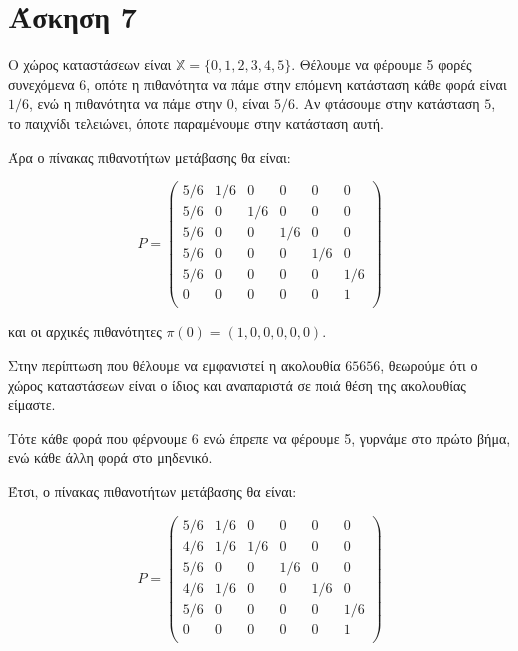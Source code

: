 \documentclass[11pt,a4paper]{article}
\begin{document}
\section*{Άσκηση 7}

Ο χώρος καταστάσεων είναι $\mathbb{X} = \{0, 1, 2, 3, 4, 5\}$. Θέλουμε να φέρουμε 5 φορές συνεχόμενα 6, οπότε η πιθανότητα να πάμε στην επόμενη κατάσταση κάθε φορά είναι $1/6$, ενώ η πιθανότητα να πάμε στην $0$, είναι $5/6$. Αν φτάσουμε στην κατάσταση $5$, το παιχνίδι τελειώνει, όποτε παραμένουμε στην κατάσταση αυτή.

Άρα ο πίνακας πιθανοτήτων μετάβασης θα είναι:

\begin{equation*}
    P = 
    \begin{pmatrix}
        5/6 & 1/6 & 0   & 0   & 0   & 0   \\
        5/6 & 0   & 1/6 & 0   & 0   & 0   \\
        5/6 & 0   & 0   & 1/6 & 0   & 0   \\
        5/6 & 0   & 0   & 0   & 1/6 & 0   \\
        5/6 & 0   & 0   & 0   & 0   & 1/6 \\
        0   & 0   & 0   & 0   & 0   & 1   \\
    \end{pmatrix}
\end{equation*}

και οι αρχικές πιθανότητες $π(0) = (1, 0, 0, 0, 0, 0)$.


Στην περίπτωση που θέλουμε να εμφανιστεί η ακολουθία $65656$, θεωρούμε ότι ο χώρος καταστάσεων είναι ο ίδιος και αναπαριστά σε ποιά θέση της ακολουθίας είμαστε.

Τότε κάθε φορά που φέρνουμε 6 ενώ έπρεπε να φέρουμε 5, γυρνάμε στο πρώτο βήμα, ενώ κάθε άλλη φορά στο μηδενικό.

Έτσι, ο πίνακας πιθανοτήτων μετάβασης θα είναι:

\begin{equation*}
    P = 
    \begin{pmatrix}
        5/6 & 1/6 & 0   & 0   & 0   & 0   \\
        4/6 & 1/6 & 1/6 & 0   & 0   & 0   \\
        5/6 & 0   & 0   & 1/6 & 0   & 0   \\
        4/6 & 1/6 & 0   & 0   & 1/6 & 0   \\
        5/6 & 0   & 0   & 0   & 0   & 1/6 \\
        0   & 0   & 0   & 0   & 0   & 1   \\
    \end{pmatrix}
\end{equation*}
\end{document}

